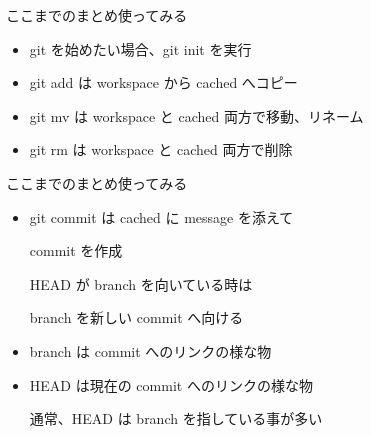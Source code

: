 
\begin{frame}[t]{ここまでのまとめ}{使ってみる}

  \begin{itemize}
  \item git を始めたい場合、git init を実行
    \vspace{2ex}

  \item git add は workspace から cached へコピー
    \vspace{2ex}

  \item git mv は workspace と cached 両方で移動、リネーム
    \vspace{2ex}

  \item git rm は workspace と cached 両方で削除
  \end{itemize}

\end{frame}

\begin{frame}[t]{ここまでのまとめ}{使ってみる}
  \begin{itemize}
  \item git commit は cached に message を添えて

    commit を作成

    HEAD が branch を向いている時は

    branch を新しい commit へ向ける
    \vspace{2ex}

  \item branch は commit へのリンクの様な物
    \vspace{2ex}

  \item HEAD は現在の commit へのリンクの様な物

    通常、HEAD は branch を指している事が多い
  \end{itemize}

\end{frame}

